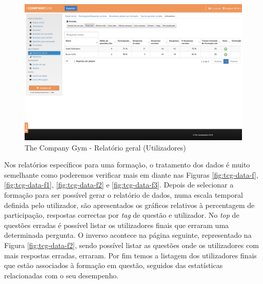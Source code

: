 \begin{figure}[ht!]
	\begin{center}
		\includegraphics[width=1\textwidth]{img/tcg/tcg-data4.png}
		\caption{The Company Gym - Relatório geral (Utilizadores)}
		\label{fig:tcg-data4}
	\end{center}
\end{figure}

\newpage

Nos relatórios específicos para uma formação, o tratamento dos dados é muito semelhante como poderemos verificar mais em diante nas Figuras \ref{fig:tcg-data-f},  \ref{fig:tcg-data-f1}, \ref{fig:tcg-data-f2} e \ref{fig:tcg-data-f3}. Depois de selecionar a formação para ser possível gerar o relatório de dados, numa escala temporal definida pelo utilizador, são apresentados os gráficos relativos à percentagem de participação, respostas correctas por \textit{tag} de questão e utilizador. 
No \textit{top} de questões erradas é possível listar os utilizadores finais que erraram uma determinada pergunta. O inverso acontece na página seguinte, representado na Figura \ref{fig:tcg-data-f2}, sendo possível listar as questões onde os utilizadores com mais respostas erradas, erraram. 
Por fim temos a listagem dos utilizadores finais que estão associados à formação em questão, seguidos das estatísticas relacionadas com o seu desempenho.


